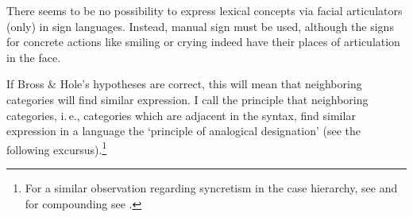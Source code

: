 \noindent There seems to be no possibility to express lexical concepts via facial articulators (only) in sign languages. Instead, manual sign must be used, although the signs for concrete actions like smiling or crying indeed have their places of articulation in the face. 

If Bross \& Hole's hypotheses are correct, this will mean that neighboring categories will find similar expression. I call the principle that neighboring categories, i.\,e., categories which are adjacent in the syntax, find similar expression in a language the `principle of analogical designation' (see the following excursus).\footnote{ For a similar observation regarding syncretism in the case hierarchy, see \citet{caha2009nanosyntax} and for compounding see \citet{hole2015arguments}.}

\begin{savenotes}
\begin{theo}
\vspace{-0.3cm}\linebreak

\end{theo}
\end{savenotes}

